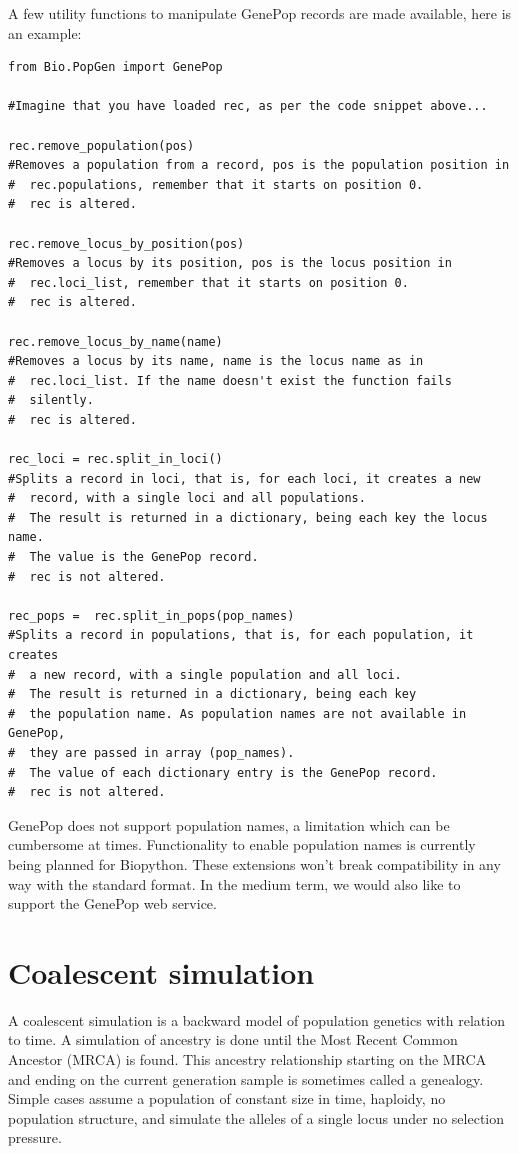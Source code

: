 \documentclass{report}
\begin{document}
A few utility functions to manipulate GenePop records are made
available, here is an example:

\begin{verbatim}
from Bio.PopGen import GenePop

#Imagine that you have loaded rec, as per the code snippet above...

rec.remove_population(pos)
#Removes a population from a record, pos is the population position in
#  rec.populations, remember that it starts on position 0.
#  rec is altered.

rec.remove_locus_by_position(pos)
#Removes a locus by its position, pos is the locus position in
#  rec.loci_list, remember that it starts on position 0.
#  rec is altered.

rec.remove_locus_by_name(name)
#Removes a locus by its name, name is the locus name as in
#  rec.loci_list. If the name doesn't exist the function fails
#  silently.
#  rec is altered.

rec_loci = rec.split_in_loci()
#Splits a record in loci, that is, for each loci, it creates a new
#  record, with a single loci and all populations.
#  The result is returned in a dictionary, being each key the locus name.
#  The value is the GenePop record.
#  rec is not altered.

rec_pops =  rec.split_in_pops(pop_names)
#Splits a record in populations, that is, for each population, it creates
#  a new record, with a single population and all loci.
#  The result is returned in a dictionary, being each key
#  the population name. As population names are not available in GenePop,
#  they are passed in array (pop_names).
#  The value of each dictionary entry is the GenePop record.
#  rec is not altered.
\end{verbatim}

GenePop does not support population names, a limitation which can be
cumbersome at times. Functionality to enable population names is currently
being planned for Biopython. These extensions won't break compatibility in
any way with the standard format.  In the medium term, we would also like to
support the GenePop web service.

\section{Coalescent simulation}

A coalescent simulation is a backward model of population genetics with relation to
time. A simulation of ancestry is done until the Most Recent Common Ancestor (MRCA) is found.
This ancestry relationship starting on the MRCA and ending on the current generation
sample is sometimes called a genealogy. Simple cases assume a population of constant
size in time, haploidy, no population structure, and simulate the alleles of a single
locus under no selection pressure.
\end{document}
